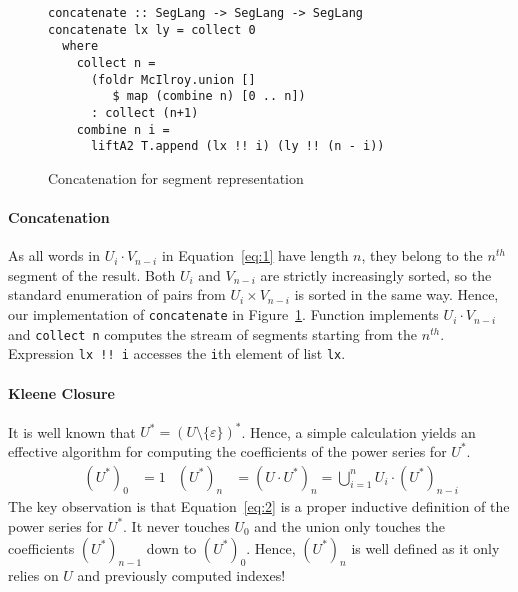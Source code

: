 \begin{figure}[tp]
\begin{lstlisting}
concatenate :: SegLang -> SegLang -> SegLang
concatenate lx ly = collect 0
  where
    collect n =
      (foldr McIlroy.union []
         $ map (combine n) [0 .. n])
      : collect (n+1)
    combine n i =
      liftA2 T.append (lx !! i) (ly !! (n - i))
\end{lstlisting}
  \caption{Concatenation for segment representation}
  \label{fig:concatenate-with-segments}
\end{figure}

\paragraph{Concatenation}
As all
words in $U_i \cdot V_{n-i}$ in Equation~\eqref{eq:1} have length $n$, they belong to the
$n^{th}$ segment of the result. Both $U_i$ and
$V_{n-i}$ are strictly increasingly sorted, so the standard enumeration of pairs from
$U_i \times
V_{n-i}$ is sorted in the same way. Hence, our implementation of
\lstinline{concatenate} in Figure~\ref{fig:concatenate-with-segments}.  Function  implements $U_i
\cdot V_{n-i}$ and  \lstinline{collect n} computes the stream of segments starting from
the $n^{th}$. Expression \lstinline{lx !! i} accesses the \lstinline{i}th element of
list \lstinline{lx}.  


\paragraph{Kleene Closure}
It is well known that $U^* = (U\setminus\{\varepsilon\})^*$. 
Hence, a simple calculation yields an
effective algorithm for computing the coefficients of the power series for $U^*$. 
\begin{align}
  \label{eq:2}
  &%
  & (U^*)_0 &= 1
  & (U^*)_n &= (U \cdot U^*)_n = \bigcup_{i=1}^n U_i\cdot (U^*)_{n-i}
\end{align}
The key observation is that Equation~\eqref{eq:2} is a proper
inductive definition of the power series for $U^*$. It never touches $U_0$ and the union
only touches the coefficients $(U^*)_{n-1}$ down to $(U^*)_0$. Hence, $(U^*)_n$ is well
defined as it only relies on $U$ and previously computed indexes!

